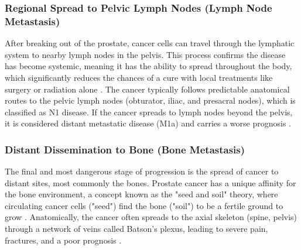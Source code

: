 \documentclass[11pt, a4paper]{article}
\begin{document}
\subsubsection{Regional Spread to Pelvic Lymph Nodes (Lymph Node Metastasis)}
After breaking out of the prostate, cancer cells can travel through the lymphatic system to nearby lymph nodes in the pelvis. This process confirms the disease has become systemic, meaning it has the ability to spread throughout the body, which significantly reduces the chances of a cure with local treatments like surgery or radiation alone \cite{CaglicBarrett2018, ZarzourGalgano2017}. The cancer typically follows predictable anatomical routes to the pelvic lymph nodes (obturator, iliac, and presacral nodes), which is classified as N1 disease. If the cancer spreads to lymph nodes beyond the pelvis, it is considered distant metastatic disease (M1a) and carries a worse prognosis \cite{CaglicBarrett2018, OliveiraFerreira2023}.

\subsubsection{Distant Dissemination to Bone (Bone Metastasis)}
The final and most dangerous stage of progression is the spread of cancer to distant sites, most commonly the bones. Prostate cancer has a unique affinity for the bone environment, a concept known as the "seed and soil" theory, where circulating cancer cells ("seed") find the bone ("soil") to be a fertile ground to grow \cite{RucciAngelucci2014, PawanRich2024}. Anatomically, the cancer often spreads to the axial skeleton (spine, pelvis) through a network of veins called Batson's plexus, leading to severe pain, fractures, and a poor prognosis \cite{UnknownAuthor2012, RucciAngelucci2014, MohseniniaZamaniSiahkali2024}.
\end{document}
